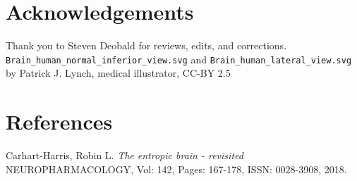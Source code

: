 \documentclass[a4paper, amsfonts, amssymb, amsmath, reprint, showkeys, nofootinbib, twoside]{revtex4-1}
\begin{document}
\section*{Acknowledgements}

Thank you to Steven Deobald for reviews, edits, and corrections. \texttt{Brain\_human\_normal\_inferior\_view.svg} and
\texttt{Brain\_human\_lateral\_view.svg} by Patrick J. Lynch, medical illustrator, CC-BY 2.5 \cite{brainsvg}


\section*{References}

\begin{thebibliography}{99}

  Carhart-Harris, Robin L.
  \textit{The entropic brain - revisited}
  NEUROPHARMACOLOGY, Vol: 142, Pages: 167-178, ISSN: 0028-3908, 2018.


\end{thebibliography}

% 
\end{document}
